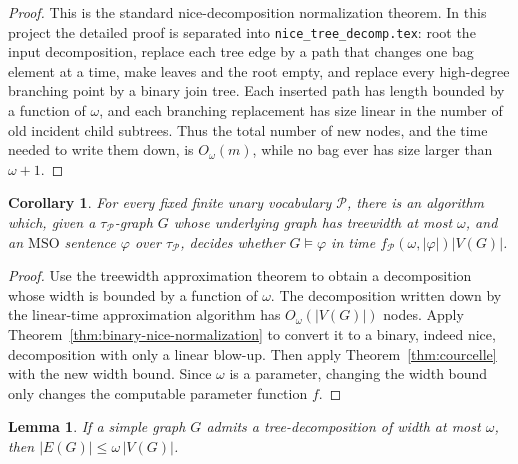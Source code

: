 \documentclass[11pt]{article}
\newtheorem{corollary}[theorem]{Corollary}
\newtheorem{lemma}[theorem]{Lemma}
\theoremstyle{definition}
\newcommand{\MSO}{\ensuremath{\mathrm{MSO}}}
\newcommand{\Pred}{\mathcal P}
\begin{document}
\begin{proof}
This is the standard nice-decomposition normalization theorem.  In this project
the detailed proof is separated into \texttt{nice\_tree\_decomp.tex}: root the
input decomposition, replace each tree edge by a path that changes one bag
element at a time, make leaves and the root empty, and replace every high-degree
branching point by a binary join tree.  Each inserted path has length bounded by
a function of \(\omega\), and each branching replacement has size linear in the
number of old incident child subtrees.  Thus the total number of new nodes, and
the time needed to write them down, is \(O_\omega(m)\), while no bag ever has
size larger than \(\omega+1\).
\end{proof}

\begin{corollary}
For every fixed finite unary vocabulary \(\Pred\), there is an algorithm which,
given a \(\tau_{\Pred}\)-graph \(G\) whose underlying graph has treewidth at most
\(\omega\), and an \MSO{} sentence \(\varphi\) over \(\tau_{\Pred}\), decides
whether \(G\models\varphi\) in time \(f_{\Pred}(\omega,|\varphi|)|V(G)|\).
\end{corollary}

\begin{proof}
Use the treewidth approximation theorem to obtain a decomposition whose width is
bounded by a function of \(\omega\).  The decomposition written down by the
linear-time approximation algorithm has \(O_\omega(|V(G)|)\) nodes.  Apply
Theorem~\ref{thm:binary-nice-normalization} to convert it to a binary, indeed
nice, decomposition with only a linear blow-up.  Then apply
Theorem~\ref{thm:courcelle} with the new width bound.  Since \(\omega\) is a
parameter, changing the width bound only changes the computable parameter
function \(f\).
\end{proof}

\begin{lemma}\label{lem:tw-edges}
If a simple graph \(G\) admits a tree-decomposition of width at most \(\omega\),
then \(|E(G)|\le\omega\,|V(G)|\).
\end{lemma}
\end{document}
